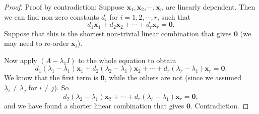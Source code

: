 \documentclass[a4paper]{article}
\begin{document}
\begin{proof}
  Proof by contradiction: Suppose $\mathbf{x}_1, \mathbf{x}_2, \cdots, \mathbf{x}_n$ are linearly dependent. Then we can find non-zero constants $d_i$ for $i = 1, 2, \cdots, r$, such that
  \[
    d_1\mathbf{x}_1 + d_2\mathbf{x}_2 + \cdots + d_r\mathbf{x}_r = \mathbf{0}.
  \]
  Suppose that this is the shortest non-trivial linear combination that gives $\mathbf{0}$ (we may need to re-order $\mathbf{x}_i$).

  Now apply $(A - \lambda_1 I)$ to the whole equation to obtain
  \[
    d_1(\lambda_1 - \lambda_1)\mathbf{x}_1 + d_2(\lambda_2 - \lambda_1)\mathbf{x}_2 + \cdots + d_r(\lambda_r - \lambda_1)\mathbf{x}_r = \mathbf{0}.
  \]
  We know that the first term is $\mathbf{0}$, while the others are not (since we assumed $\lambda_i \not= \lambda_j$ for $i\not= j$). So
  \[
    d_2(\lambda_2 - \lambda_1)\mathbf{x}_2 + \cdots + d_r(\lambda_r - \lambda_1)\mathbf{x}_r = \mathbf{0},
  \]
  and we have found a shorter linear combination that gives $\mathbf{0}$. Contradiction.
\end{proof}
\end{document}

